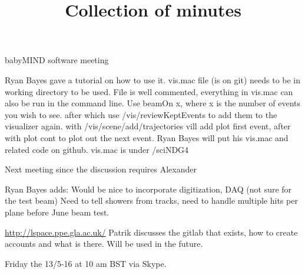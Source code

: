 \documentclass{article}
\title{Collection of minutes}
\author{\LaTeXe}
\begin{document}
\begin{Minutes}{babyMIND software meeting}

\maketitle

Ryan Bayes gave a tutorial on how to use it.
vis.mac file (is on git) needs to be in working directory to be used.
File is well commented, everything in vis.mac can also be run in the command line.
Use beamOn x, where x is the number of events you wish to see.
after which use /vis/reviewKeptEvents to add them to the visualizer again.
with /vis/scene/add/trajectories vill add plot first event,
after with plot cont to plot out the next event.
Ryan Bayes will put his vis.mac and related code on github.
vis.mac is under /sciNDG4

Next meeting since the discussion requires Alexander

Ryan Bayes adds:
Would be nice to incorporate digitization, DAQ (not sure for the test beam)
Need to tell showers from tracks,
need to handle multiple hits per plane before June beam test.

\url{http://lspace.ppe.gla.ac.uk/}
Patrik discusses the gitlab that exists, how to create accounts and what is there.
Will be used in the future.

Friday the 13/5-16 at 10 am BST via Skype.

\end{Minutes}
\end{document}
